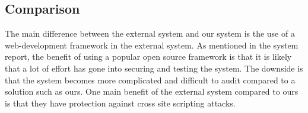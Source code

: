 \documentclass{article}
\begin{document}
\subsection{Comparison}
The main difference between the external system and our system is the use of a web-development framework in the external system.
As mentioned in the system report, the benefit of using a popular open source framework is that it is likely that a lot of effort has gone into securing and testing the system.  
The downside is that the system becomes more complicated and difficult to audit compared to a solution such as ours.
One main benefit of the external system compared to ours is that they have protection against cross site scripting attacks.
\end{document}
